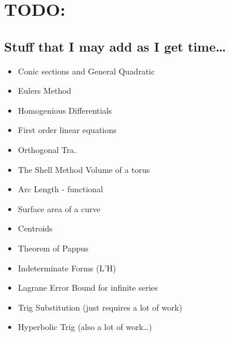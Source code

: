 \section{\color{Gray}TODO:}
  \subsection{\color{BrickRed}Stuff that I may add as I get
  time\ldots}
  \begin{itemize}
    \item Conic sections and General Quadratic
    \item Eulers Method
    \item Homogenious Differentials
    \item First order linear equations
    \item Orthogonal Tra.
    \item The Shell Method
      \subitem Volume of a torus
    \item Arc Length - functional
    \item Surface area of a curve
    \item Centroids
    \item Theorem of Pappus
    \item Indeterminate Forms (L'H)
    \item Lagrane Error Bound for infinite series
    \item Trig Substitution (just requires a lot of work)
    \item Hyperbolic Trig (also a lot of work\ldots)
  \end{itemize}
